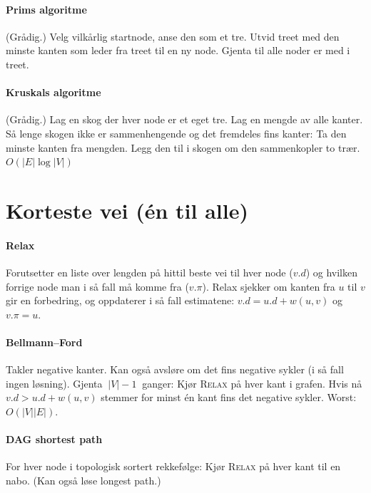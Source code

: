 \documentclass[a4paper]{article}
\begin{document}
\paragraph{Prims algoritme} (Grådig.) Velg vilkårlig startnode, anse den som et tre. Utvid treet med den minste kanten som leder fra treet til en ny node. Gjenta til alle noder er med i treet.
\paragraph{Kruskals algoritme} (Grådig.) Lag en skog der hver node er et eget tre. Lag en mengde av alle kanter. Så lenge skogen ikke er sammenhengende og det fremdeles fins kanter: Ta den minste kanten fra mengden. Legg den til i skogen om den sammenkopler to trær. $O(|E| \log |V|)$



\section{Korteste vei (én til alle)}
\paragraph{Relax} Forutsetter en liste over lengden på hittil beste vei til hver node ($v.d$) og hvilken forrige node man i så fall må komme fra ($v.\pi$). Relax sjekker om kanten fra $u$ til $v$ gir en forbedring, og oppdaterer i så fall estimatene: $v.d = u.d + w(u, v)$ og $v.\pi = u$.
\paragraph{Bellmann--Ford} Takler negative kanter. Kan også avsløre om det fins negative sykler (i så fall ingen løsning). Gjenta $\:|V|-1\:$ ganger: Kjør \mbox{\textsc{Relax}} på hver kant i grafen. Hvis nå $v.d > u.d + w(u, v)$ stemmer for minst én kant fins det negative sykler. Worst: $O(|V| |E|)$.
\paragraph{DAG shortest path} For hver node i topologisk sortert rekkefølge: Kjør \mbox{\textsc{Relax}} på hver kant til en nabo. (Kan også løse longest path.)
\end{document}
